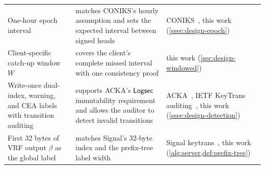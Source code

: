 \begin{table}[htbp]
\begin{tabularx}{\textwidth}{@{}>{\raggedright\arraybackslash}p{3.7cm}>{\raggedright\arraybackslash}X>{\raggedright\arraybackslash}p{3.3cm}@{}}
One-hour epoch interval & matches CONIKS's hourly assumption and sets the expected interval between signed heads & CONIKS~\cite{melara2015coniks}, this work (\cref{ssec:design-epoch}) \\
Client-specific catch-up window $W$ & covers the client's complete missed interval with one consistency proof & this work (\cref{sec:design-windowed}) \\
Write-once dual-index, warning, and CEA labels with transition auditing & supports ACKA's $\mathsf{Logsec}$ immutability requirement and allows the auditor to detect invalid transitions & ACKA~\cite{dowling2023acka}, IETF KeyTrans auditing~\cite{ietf-keytrans-protocol}, this work (\cref{ssec:design-detection}) \\
First 32 bytes of VRF output $\beta$ as the global label & matches Signal's 32-byte index and the prefix-tree label width & Signal keytrans~\cite{signal-kt-server}, this work (\cref{alg:server,def:prefix-tree}) \\
\bottomrule
\end{tabularx}
\end{table}
\FloatBarrier

